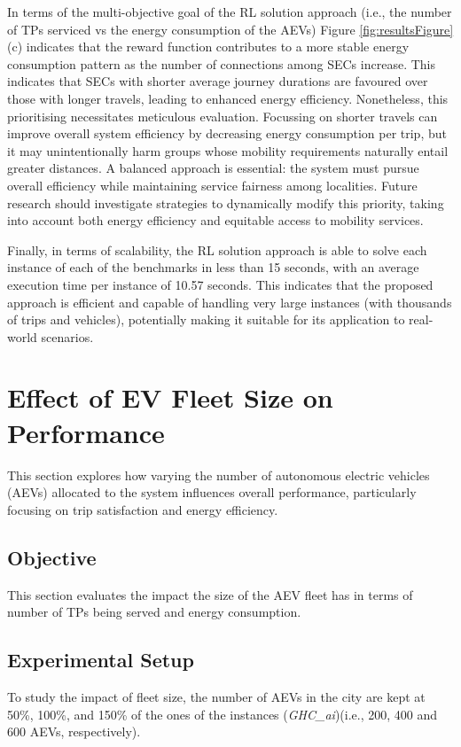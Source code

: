 In terms of the multi-objective goal of the RL solution approach
(i.e., the number of TPs serviced vs the energy consumption of the AEVs)
Figure \ref{fig:resultsFigure}(c) indicates that the reward function contributes to a more stable energy consumption pattern as the number of connections among SECs increase.
This indicates that SECs with shorter average journey durations are favoured over those with longer travels, leading to enhanced energy efficiency.  Nonetheless, this prioritising necessitates meticulous evaluation.  Focussing on shorter travels can improve overall system efficiency by decreasing energy consumption per trip, but it may unintentionally harm groups whose mobility requirements naturally entail greater distances.  A balanced approach is essential: the system must pursue overall efficiency while maintaining service fairness among localities.  Future research should investigate strategies to dynamically modify this priority, taking into account both energy efficiency and equitable access to mobility services.

Finally, in terms of scalability, the RL solution approach
is able to solve each instance of each of the benchmarks in less than 15 seconds, with an average execution time
per instance of 10.57 seconds. This indicates that the
proposed approach is efficient and capable of handling very large instances (with thousands of trips and vehicles),
potentially making it suitable for its application to real-world scenarios.

\section{Effect of EV Fleet Size on Performance}
\label{sec:fleet_size_performance}
This section explores how varying the number of autonomous electric vehicles (AEVs) allocated to the system influences overall performance, particularly focusing on trip satisfaction and energy efficiency.

\subsection{Objective}
This section evaluates the impact the size of the AEV fleet has in terms of number of TPs being served and energy consumption. 

\subsection{Experimental Setup}
To study the impact of fleet size, the number of AEVs in the city are kept at 50\%, 100\%, and 150\% of the ones of the instances (\emph{GHC\_ai})(i.e., 200, 400 and 600 AEVs, respectively). 

